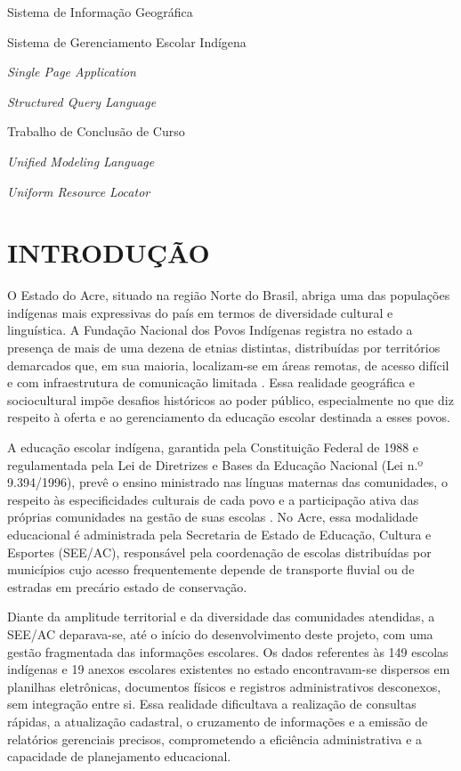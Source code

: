 \documentclass[12pt,a4paper,oneside]{abntspiifac}
\begin{document}
\begin{siglas}
  \item[SIG]    Sistema de Informação Geográfica
  \item[SIGEI]  Sistema de Gerenciamento Escolar Indígena
  \item[SPA]    \textit{Single Page Application}
  \item[SQL]    \textit{Structured Query Language}
  \item[TCC]    Trabalho de Conclusão de Curso
  \item[UML]    \textit{Unified Modeling Language}
  \item[URL]    \textit{Uniform Resource Locator}
\end{siglas}

\tableofcontents*
\cleardoublepage

\textual


\chapter{INTRODUÇÃO}
\label{cap:introducao}

O Estado do Acre, situado na região Norte do Brasil, abriga uma das populações indígenas mais expressivas do país em termos de diversidade cultural e linguística. A Fundação Nacional dos Povos Indígenas registra no estado a presença de mais de uma dezena de etnias distintas, distribuídas por territórios demarcados que, em sua maioria, localizam-se em áreas remotas, de acesso difícil e com infraestrutura de comunicação limitada \cite{brasil1988}. Essa realidade geográfica e sociocultural impõe desafios históricos ao poder público, especialmente no que diz respeito à oferta e ao gerenciamento da educação escolar destinada a esses povos.

A educação escolar indígena, garantida pela Constituição Federal de 1988 e regulamentada pela Lei de Diretrizes e Bases da Educação Nacional (Lei n.º 9.394/1996), prevê o ensino ministrado nas línguas maternas das comunidades, o respeito às especificidades culturais de cada povo e a participação ativa das próprias comunidades na gestão de suas escolas \cite{brasil1996}. No Acre, essa modalidade educacional é administrada pela Secretaria de Estado de Educação, Cultura e Esportes (SEE/AC), responsável pela coordenação de escolas distribuídas por municípios cujo acesso frequentemente depende de transporte fluvial ou de estradas em precário estado de conservação.

Diante da amplitude territorial e da diversidade das comunidades atendidas, a SEE/AC deparava-se, até o início do desenvolvimento deste projeto, com uma gestão fragmentada das informações escolares. Os dados referentes às 149 escolas indígenas e 19 anexos escolares existentes no estado encontravam-se dispersos em planilhas eletrônicas, documentos físicos e registros administrativos desconexos, sem integração entre si. Essa realidade dificultava a realização de consultas rápidas, a atualização cadastral, o cruzamento de informações e a emissão de relatórios gerenciais precisos, comprometendo a eficiência administrativa e a capacidade de planejamento educacional.
\end{document}
